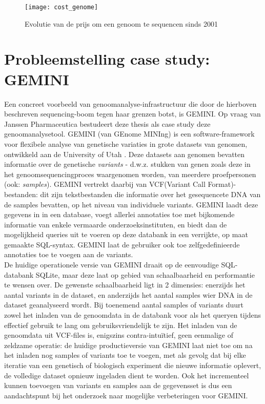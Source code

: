 \begin{figure}[h!]
\texttt{[image: cost\_genome]}
\caption{Evolutie van de prijs om een genoom te sequencen sinds 2001 \cite{wetterstrand_sequencing_cost}}
\label{sequencing_cost}
\end{figure}

\section{Probleemstelling case study: GEMINI}

Een concreet voorbeeld van genoomanalyse-infrastructuur die door de hierboven beschreven sequencing-boom tegen haar grenzen botst, is GEMINI. Op vraag van Janssen Pharmaceutica bestudeert deze thesis als case study deze genoomanalysetool. GEMINI (van GEnome MINIng) is een software-framework voor flexibele analyse van genetische variaties in grote datasets van genomen, ontwikkeld aan de University of Utah \cite{10.1371/journal.pcbi.1003153}. Deze datasets aan genomen bevatten informatie over de genetische \textit{variants} - d.w.z. stukken van genen zoals deze in het genoomsequencingproces waargenomen worden, van meerdere proefpersonen (ook: \textit{samples}). GEMINI vertrekt daarbij van VCF(Variant Call Format)-bestanden: dit zijn tekstbestanden die informatie over het gesequencete DNA van de samples bevatten, op het niveau van individuele variants. GEMINI laadt deze gegevens in in een database, voegt allerlei annotaties toe met bijkomende informatie van enkele vermaarde onderzoeksinstituten, en biedt dan de mogelijkheid queries uit te voeren op deze databank in een verrijkte, op maat gemaakte SQL-syntax. GEMINI laat de gebruiker ook toe zelfgedefinieerde annotaties toe te voegen aan de variants. \\
De huidige operationele versie van GEMINI draait op de eenvoudige SQL-databank SQLite, maar deze laat op gebied van schaalbaarheid en performantie te wensen over. De gewenste schaalbaarheid ligt in 2 dimensies: enerzijds het aantal variants in de dataset, en anderzijds het aantal samples wier DNA in de dataset geanalyseerd wordt. Bij toenemend aantal samples of variants duurt zowel het inladen van de genoomdata in de databank voor als het queryen tijdens effectief gebruik te lang om gebruiksvriendelijk te zijn. Het inladen van de genoomdata uit VCF-files is, enigszins contra-intu\"itief, geen eenmalige of zeldzame operatie: de huidige productieversie van GEMINI laat niet toe om na het inladen nog samples of variants toe te voegen, met als gevolg dat bij elke iteratie van een genetisch of biologisch experiment die nieuwe informatie oplevert, de volledige dataset opnieuw ingeladen dient te worden. Ook het incrementeel kunnen toevoegen van variants en samples aan de gegevensset is dus een aandachtspunt bij het onderzoek naar mogelijke verbeteringen voor GEMINI.\\
